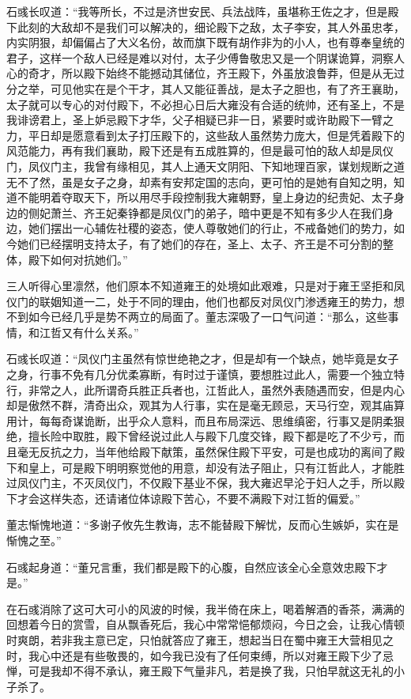 石彧长叹道：“我等所长，不过是济世安民、兵法战阵，虽堪称王佐之才，但是殿下此刻的大敌却不是我们可以解决的，细论殿下之敌，太子李安，其人外虽忠孝，内实阴狠，却偏偏占了大义名份，故而旗下既有胡作非为的小人，也有尊奉皇统的君子，这样一个敌人已经是难以对付，太子少傅鲁敬忠又是一个阴谋诡算，洞察人心的奇才，所以殿下始终不能撼动其储位，齐王殿下，外虽放浪鲁莽，但是从无过分之举，可见他实在是个干才，其人又能征善战，是太子之胆也，有了齐王襄助，太子就可以专心的对付殿下，不必担心日后大雍没有合适的统帅，还有圣上，不是我诽谤君上，圣上妒忌殿下才华，父子相疑已非一日，紧要时或许助殿下一臂之力，平日却是愿意看到太子打压殿下的，这些敌人虽然势力庞大，但是凭着殿下的风范能力，再有我们襄助，殿下还是有五成胜算的，但是最可怕的敌人却是凤仪门，凤仪门主，我曾有缘相见，其人上通天文阴阳、下知地理百家，谋划规断之道无不了然，虽是女子之身，却素有安邦定国的志向，更可怕的是她有自知之明，知道不能明着夺取天下，所以用尽手段控制我大雍朝野，皇上身边的纪贵妃、太子身边的侧妃萧兰、齐王妃秦铮都是凤仪门的弟子，暗中更是不知有多少人在我们身边，她们摆出一心辅佐社稷的姿态，使人尊敬她们的行止，不戒备她们的势力，如今她们已经摆明支持太子，有了她们的存在，圣上、太子、齐王是不可分割的整体，殿下如何对抗她们。”

三人听得心里凛然，他们原本不知道雍王的处境如此艰难，只是对于雍王坚拒和凤仪门的联姻知道一二，处于不同的理由，他们也都反对凤仪门渗透雍王的势力，想不到如今已经几乎是势不两立的局面了。董志深吸了一口气问道：“那么，这些事情，和江哲又有什么关系。”

石彧长叹道：“凤仪门主虽然有惊世绝艳之才，但是却有一个缺点，她毕竟是女子之身，行事不免有几分优柔寡断，有时过于谨慎，要想胜过此人，需要一个独立特行，非常之人，此所谓奇兵胜正兵者也，江哲此人，虽然外表随遇而安，但是内心却是傲然不群，清奇出众，观其为人行事，实在是毫无顾忌，天马行空，观其庙算用计，每每奇谋诡断，出乎众人意料，而且布局深远、思维缜密，行事又是阴柔狠绝，擅长险中取胜，殿下曾经说过此人与殿下几度交锋，殿下都是吃了不少亏，而且毫无反抗之力，当年他给殿下献策，虽然保住殿下平安，可是也成功的离间了殿下和皇上，可是殿下明明察觉他的用意，却没有法子阻止，只有江哲此人，才能胜过凤仪门主，不灭凤仪门，不仅殿下基业不保，我大雍迟早沦于妇人之手，所以殿下才会这样失态，还请诸位体谅殿下苦心，不要不满殿下对江哲的偏爱。”

董志惭愧地道：“多谢子攸先生教诲，志不能替殿下解忧，反而心生嫉妒，实在是惭愧之至。”

石彧起身道：“董兄言重，我们都是殿下的心腹，自然应该全心全意效忠殿下才是。”

在石彧消除了这可大可小的风波的时候，我半倚在床上，喝着解酒的香茶，满满的回想着今日的赏雪，自从飘香死后，我心中常常悒郁烦闷，今日之会，让我心情顿时爽朗，若非我主意已定，只怕就答应了雍王，想起当日在蜀中雍王大营相见之时，我心中还是有些敬畏的，如今我已没有了任何束缚，所以对雍王殿下少了忌惮，可是我却不得不承认，雍王殿下气量非凡，若是换了我，只怕早就这无礼的小子杀了。

